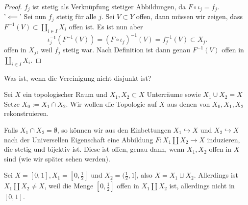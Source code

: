 \begin{proof}
    $f_j$ ist stetig als Verknüpfung stetiger Abbildungen, da  $F \circ  ι_j = f_j$. \\
    '$\impliedby$' Sei nun $f_j$ stetig  für alle $j$. Sei  $V\subset Y$ offen, dann müssen wir zeigen, dass $F^{-1}(V)\subset \coprod_{i \in I}X_i$ offen ist. Es ist nun aber
    \[
        ι_j^{-1} (F^{-1}(V)) = (F \circ  ι_j)^{-1}(V) = f_j^{-1}(V) \subset X_j
    .\] 
    offen in $X_j$, weil $f_j$ stetig war. Nach Definition ist dann genau  $F^{-1}(V)$ offen in $\coprod_{i \in I}X_i$.
\end{proof}

\begin{question}
    Was ist, wenn die Vereinigung nicht disjunkt ist?
\end{question}

Sei $X$ ein topologischer Raum und $X_1,X_2\subset X$ Unterräume sowie $X_1\cup X_2 = X$ Setze $X_0 := X_1\cap X_2$. Wir wollen die Topologie auf $X$ aus denen von  $X_0,X_1,X_2$ rekonstruieren.

\begin{example}
    Falls $X_1\cap X_2=\emptyset$, so können wir aus den Einbettungen $X_1\hookrightarrow  X$ und $X_2\hookrightarrow X$ nach der Universellen Eigenschaft eine Abbildung $F:X_1\coprod X_2 \to  X$ induzieren, die stetig und bijektiv ist. Diese ist offen, genau dann, wenn $X_1,X_2$ offen in $X$ sind (wie wir später sehen werden).
\end{example}

\begin{example}
    Sei $X = [0,1], X_1 = [0,\frac{1}{2}]$ und $X_2 = (\frac{1}{2},1]$, also $X = X_1 \sqcup X_2$. Allerdings ist $X_1 \coprod X_2 \neq X$, weil die Menge $[0,\frac{1}{2}]$ offen in $X_1\coprod X_2$ ist, allerdings nicht in $[0,1]$. 
\end{example}

